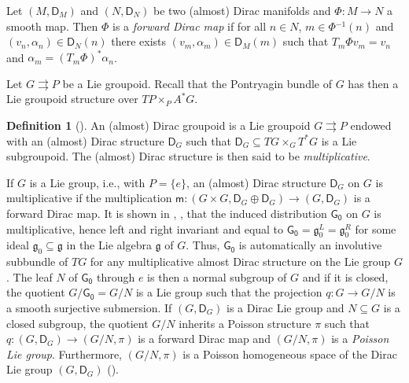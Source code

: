 \documentclass{amsart}
\theoremstyle{definition}
\newtheorem{definition}[theorem]{Definition}
\begin{document}
Let $(M, \mathsf D_M)$ and $(N, \mathsf D_N)$ be
two (almost) Dirac manifolds and $\Phi:M\to N$ a smooth map.
Then $\Phi$ is a \emph{forward Dirac map}
if for all  $n\in N$, $m\in \Phi{^{-1}}(n)$ and 
$(v_n, \alpha_n)\in\mathsf D_N(n)$ 
there exists $(v_m, \alpha_m)\in\mathsf D_M(m)$
such that $T_m\Phi v_m=v_n$ and $\alpha_m=(T_m\Phi)^*\alpha_n$.

\medskip

Let $G{{\rightrightarrows}} P$ be a Lie groupoid. Recall that the Pontryagin  bundle of $G$ has then a Lie groupoid
structure over $TP\times_PA^*G$.
\begin{definition}[\cite{Ortiz08t}]
An (almost) Dirac  groupoid is a Lie groupoid $G\rightrightarrows P$
endowed with an (almost) Dirac structure $\mathsf D_G$ such that
$\mathsf D_G\subseteq TG\times_G T^*G$ is a Lie subgroupoid.
The (almost) Dirac structure is then said to be \emph{multiplicative}.
\end{definition}

If $G$ is a Lie group, i.e., with $P=\{e\}$, an (almost) Dirac structure $\mathsf D_G$
on $G$ is multiplicative if the multiplication 
$\mathsf m: (G\times G, \mathsf D_G\oplus\mathsf D_G)\to (G,\mathsf D_G)$
is a forward Dirac map. It is shown in \cite{Ortiz08}, \cite{Jotz11a}, 
that the induced distribution $\mathsf{G_0}$
on $G$ is multiplicative, hence left and right invariant and 
equal to $\mathsf{G_0}={\mathfrak{g}}_0^L={\mathfrak{g}}_0^R$ for some 
ideal ${\mathfrak{g}}_0\subseteq {\mathfrak{g}}$ in the Lie algebra ${\mathfrak{g}}$
of $G$. Thus, $\mathsf{G_0}$ is  automatically an involutive subbundle of $TG$ for any
 multiplicative almost Dirac structure on the Lie group $G$. The leaf $N$ of $\mathsf{G_0}$
through $e$ is then a normal subgroup of $G$ and if it is closed, 
the quotient $G/\mathsf{G_0}=G/N$ is a Lie group
such that the projection 
$q:G\to G/N$ is a smooth surjective submersion. If 
$(G,\mathsf D_G)$ is a Dirac Lie group and $N\subseteq G$
is a closed subgroup, 
the quotient $G/N$ inherits a Poisson structure 
$\pi$ such that 
$q:(G,\mathsf D_G)\to (G/N,\pi)$ is a forward Dirac map and $(G/N,\pi)$ is a \emph{Poisson Lie group}.
Furthermore, $  (G/N,\pi)$ is a Poisson homogeneous space of the 
Dirac Lie group $(G,\mathsf D_G)$ (\cite{Jotz11a}).

\medskip
\end{document}

